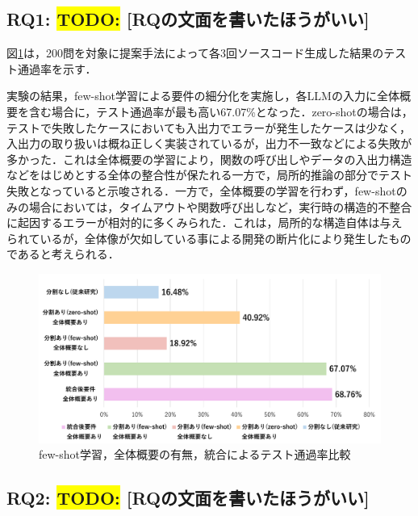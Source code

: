\documentclass[submit,techrep,noauthor]{ipsj}
\newcommand{\todo}[1]{\colorbox{yellow}{{\bf TODO}:}{\color{red} {\textbf{[#1]}}}}
\begin{document}
\subsection{RQ1: \todo{RQの文面を書いたほうがいい}}
図\ref{ses2025}は，200問を対象に提案手法によって各3回ソースコード生成した結果のテスト通過率を示す．

実験の結果，few-shot学習による要件の細分化を実施し，各LLMの入力に全体概要を含む場合に，テスト通過率が最も高い67.07\%となった．zero-shotの場合は，テストで失敗したケースにおいても入出力でエラーが発生したケースは少なく，入出力の取り扱いは概ね正しく実装されているが，出力不一致などによる失敗が多かった．これは全体概要の学習により，関数の呼び出しやデータの入出力構造などをはじめとする全体の整合性が保たれる一方で，局所的推論の部分でテスト失敗となっていると示唆される．一方で，全体概要の学習を行わず，few-shotのみの場合においては，タイムアウトや関数呼び出しなど，実行時の構造的不整合に起因するエラーが相対的に多くみられた．これは，局所的な構造自体は与えられているが，全体像が欠如している事による開発の断片化により発生したものであると考えられる．


\begin{figure}[t]
    \centering
    \includegraphics[width=1.0\linewidth]{./Toyoshima_fig/RQ1_and_RQ2.pdf}
    \caption{few-shot学習，全体概要の有無，統合によるテスト通過率比較}
    \label{ses2025}
\end{figure}

\subsection{RQ2: \todo{RQの文面を書いたほうがいい}}
\end{document}
